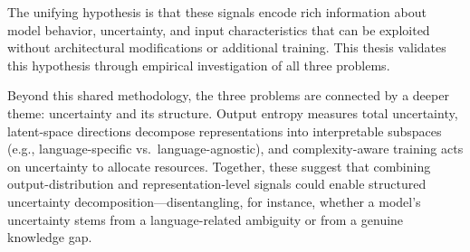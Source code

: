The unifying hypothesis is that these signals encode rich information about model behavior, uncertainty, and input characteristics that can be exploited without architectural modifications or additional training. This thesis validates this hypothesis through empirical investigation of all three problems.

Beyond this shared methodology, the three problems are connected by a deeper theme: uncertainty and its structure. Output entropy measures total uncertainty, latent-space directions decompose representations into interpretable subspaces (e.g., language-specific vs.\ language-agnostic), and complexity-aware training acts on uncertainty to allocate resources. Together, these suggest that combining output-distribution and representation-level signals could enable structured uncertainty decomposition---disentangling, for instance, whether a model's uncertainty stems from a language-related ambiguity or from a genuine knowledge gap.

